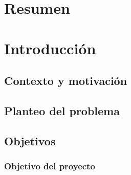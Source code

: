 
\chapter*{Resumen}

\chapter{Introducción}

\section{Contexto y motivación}

\section{Planteo del problema}

\section{Objetivos}
\subsection{Objetivo del proyecto}

